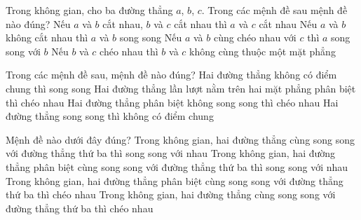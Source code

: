 

\begin{ex}%
	Trong  không gian, cho ba đường thẳng $a$, $b$, $c$. Trong các mệnh đề sau mệnh đề nào đúng?
	 \choice
		{Nếu $a$ và $b$ cắt nhau, $b$ và  $c$ cắt nhau thì $a$ và $c$ cắt nhau}
		{Nếu $a$ và  $b$ không cắt nhau thì $a$ và $b$ song song}
		{Nếu $a$ và $b$ cùng chéo nhau với $c$ thì $a$ song song  với $b$}
		{\True Nếu $b$ và $c$ chéo nhau thì $b$ và $c$  không cùng thuộc một mặt phẳng}
\end{ex}

\begin{ex}%
	Trong các mệnh đề  sau, mệnh đề nào đúng?
	 \choice
		{Hai đường thẳng không có  điểm chung thì song song}
		{Hai đường thẳng lần lượt nằm  trên hai mặt phẳng phân biệt thì chéo nhau}
		{Hai đường thẳng phân biệt không song song thì  chéo nhau}
		{\True Hai đường thẳng song  song thì không có điểm chung}
\end{ex}

\begin{ex}%
	Mệnh đề nào dưới  đây đúng?
	\choice 
		{Trong không gian, hai đường thẳng cùng song song với đường  thẳng thứ ba thì song song với nhau}
		{\True Trong không gian, hai đường thẳng phân biệt cùng song song với đường thẳng thứ ba thì song song với nhau} 
		 {Trong không gian, hai đường thẳng phân biệt cùng song song với đường thẳng thứ ba thì chéo nhau}
		{Trong không gian, hai đường thẳng cùng song song  với đường thẳng thứ ba thì chéo nhau}
\end{ex}

